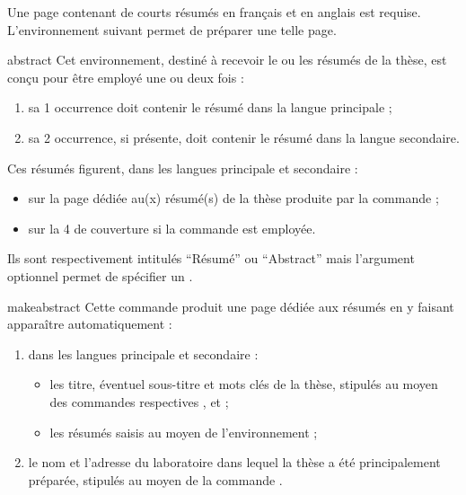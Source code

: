 Une page contenant de courts résumés en français et en anglais est requise.
L'environnement  suivant permet de préparer une telle
page.
%
\begin{docEnvironment}[doclang/environment content=résumé,doc description=\mandatory]{abstract}{}
  Cet environnement, destiné à recevoir le ou les résumés de la thèse, est
  conçu pour être employé une ou deux fois :
  \begin{enumerate}
  \item sa 1\iere{} occurrence doit contenir le résumé dans la langue
    principale ;
  \item sa 2\ieme{} occurrence, si présente, doit contenir le résumé dans la
    langue secondaire.
  \end{enumerate}
  Ces résumés figurent, dans les langues principale et secondaire :
  \begin{itemize}
  \item sur la page dédiée au(x) résumé(s) de la thèse produite par la commande
     ;
  \item sur la 4\ieme{} de couverture si la commande  est
    employée.
  \end{itemize}
  Ils sont respectivement intitulés \enquote{Résumé} ou
  \foreignquote{english}{Abstract}\selonlangue{} mais l'argument optionnel
  permet de spécifier un \redefexprcle.
\end{docEnvironment}

\begin{docCommand}[doc description=\mandatory]{makeabstract}{}
  Cette commande produit une page dédiée aux résumés en y faisant
  apparaître automatiquement :
  \begin{enumerate}
  \item dans les langues principale et secondaire :
    \begin{itemize}
    \item les titre, éventuel sous-titre et mots clés de la thèse, stipulés au
      moyen des commandes respectives ,  et
       ;
    \item les résumés saisis au moyen de l'environnement  ;
    \end{itemize}
  \item le nom et l'adresse du laboratoire dans lequel la thèse a été
    principalement préparée, stipulés au moyen de la commande
    .
  \end{enumerate}
\end{docCommand}

